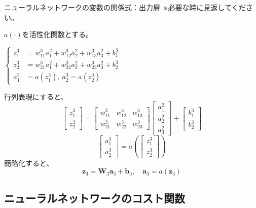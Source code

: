 \documentclass[dvipdfmx,aspectratio=169]{beamer}
\begin{document}
	\begin{frame}[allowframebreaks]{ニューラルネットワークの変数の関係式：出力層}
		※必要な時に見返してください。\vspace{4em}
		
		$ a(\cdot) $を活性化関数とする。
		\begin{screen}
			$ \left\{
			\begin{aligned}
				z^3_1 &= w^3_{11}a^2_1 + w^3_{12}a^2_2 + w^3_{13}a^2_3 + b^3_1\\
				z^3_2 &= w^3_{21}a^2_1 + w^3_{22}a^2_2 + w^3_{23}a^2_3 + b^3_2\\
				a^3_1 &= a(z^3_1),\ a^3_2 = a(z^3_2)
			\end{aligned}
			\right. $
		\end{screen}
	
		
		行列表現にすると、
		\begin{equation*}
			\begin{bmatrix}
				z^3_1\\ z^3_2
			\end{bmatrix} = \begin{bmatrix}
				w^3_{11} & w^3_{12} & w^3_{13}\\
				w^3_{21} & w^3_{22} & w^3_{23}
			\end{bmatrix} \begin{bmatrix}
				a^2_1\\ a^2_2\\ a^2_3
			\end{bmatrix} + \begin{bmatrix}
				b^3_1\\ b^3_2
			\end{bmatrix}
		\end{equation*}
		\begin{equation*}
			\begin{bmatrix}
				a^3_1\\ a^3_2
			\end{bmatrix} = a\left(\begin{bmatrix}
				z^3_1\\ z^3_2
			\end{bmatrix}\right)
		\end{equation*}
		簡略化すると、
		\begin{equation*}
			\boldsymbol{z}_3 = \mathbf{W}_3\boldsymbol{a}_3 + \boldsymbol{b}_3,\quad \boldsymbol{a}_3 = a(\boldsymbol{z}_3)
		\end{equation*}
	\end{frame}
	
	\subsection{ニューラルネットワークのコスト関数}
	
\end{document}
